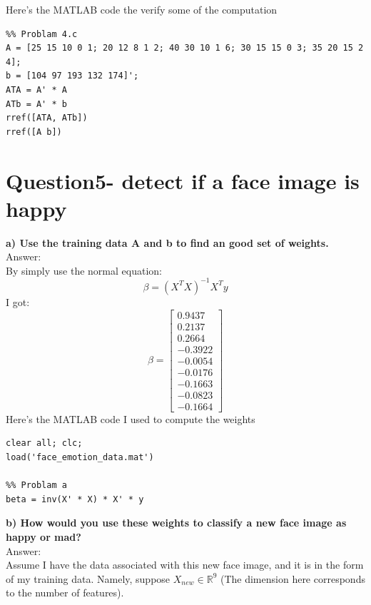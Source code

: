 \documentclass[paper=a4, fontsize=11pt]{scrartcl} %
\numberwithin{equation}{section} %
\numberwithin{figure}{section} %
\numberwithin{table}{section} %
\begin{document}
Here's the MATLAB code the verify some of the computation 
\begin{lstlisting}
%% Problam 4.c
A = [25 15 10 0 1; 20 12 8 1 2; 40 30 10 1 6; 30 15 15 0 3; 35 20 15 2 4];
b = [104 97 193 132 174]';
ATA = A' * A
ATb = A' * b 
rref([ATA, ATb])
rref([A b])
\end{lstlisting}






\newpage
\section*{Question5-  detect if a face image is happy}

\textbf{a) Use the training data A and b to find an good set of weights.}\\
Answer: \\
By simply use the normal equation:
$$
\beta = (X^T X)^{-1} X^T y
$$
I got: 
$$
\beta = 
\begin{bmatrix}
    0.9437	\\
    0.2137	\\
    0.2664	\\
   -0.3922	\\
   -0.0054	\\
   -0.0176	\\
   -0.1663	\\
   -0.0823	\\
   -0.1664
\end{bmatrix}
$$
Here's the MATLAB code I used to compute the weights

\begin{lstlisting}
clear all; clc;
load('face_emotion_data.mat')

%% Problam a
beta = inv(X' * X) * X' * y

\end{lstlisting}


\textbf{b) How would you use these weights to classify a new face image as happy or mad?}\\

Answer: \\
Assume I have the data associated with this new face image, and it is in the form of my training data. Namely, suppose $X_{new}\in \mathbb{R}^9$ (The dimension here corresponds to the number of features).
\end{document}
